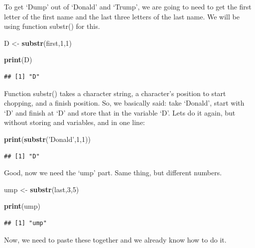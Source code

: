 \documentclass[]{book}
\newenvironment{Shaded}{\begin{snugshade}}{\end{snugshade}}
\newcommand{\DecValTok}[1]{\textcolor[rgb]{0.00,0.00,0.81}{#1}}
\newcommand{\KeywordTok}[1]{\textcolor[rgb]{0.13,0.29,0.53}{\textbf{#1}}}
\newcommand{\NormalTok}[1]{#1}
\newcommand{\StringTok}[1]{\textcolor[rgb]{0.31,0.60,0.02}{#1}}
\begin{document}
To get `Dump' out of `Donald' and `Trump', we are going to need to get the first letter of the first name and the last three letters of the last name. We will be using function substr() for this.

\begin{Shaded}
\begin{Highlighting}[]
\NormalTok{D <-}\StringTok{ }\KeywordTok{substr}\NormalTok{(first,}\DecValTok{1}\NormalTok{,}\DecValTok{1}\NormalTok{)}

\KeywordTok{print}\NormalTok{(D)}
\end{Highlighting}
\end{Shaded}

\begin{verbatim}
## [1] "D"
\end{verbatim}

Function substr() takes a character string, a character's position to start chopping, and a finish position. So, we basically said: take `Donald', start with `D' and finish at `D' and store that in the variable `D'. Lets do it again, but without storing and variables, and in one line:

\begin{Shaded}
\begin{Highlighting}[]
\KeywordTok{print}\NormalTok{(}\KeywordTok{substr}\NormalTok{(}\StringTok{'Donald'}\NormalTok{,}\DecValTok{1}\NormalTok{,}\DecValTok{1}\NormalTok{))}
\end{Highlighting}
\end{Shaded}

\begin{verbatim}
## [1] "D"
\end{verbatim}

Good, now we need the `ump' part. Same thing, but different numbers.

\begin{Shaded}
\begin{Highlighting}[]
\NormalTok{ump <-}\StringTok{ }\KeywordTok{substr}\NormalTok{(last,}\DecValTok{3}\NormalTok{,}\DecValTok{5}\NormalTok{)}

\KeywordTok{print}\NormalTok{(ump)}
\end{Highlighting}
\end{Shaded}

\begin{verbatim}
## [1] "ump"
\end{verbatim}

Now, we need to paste these together and we already know how to do it.
\end{document}
